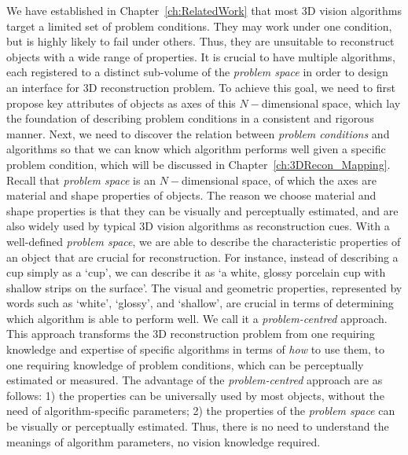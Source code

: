 We have established in Chapter~\ref{ch:RelatedWork} that most 3D vision algorithms target a limited set of problem conditions. They may work under one condition, but is highly likely to fail under others. Thus, they are unsuitable to reconstruct objects with a wide range of properties. It is crucial to have multiple algorithms, each registered to a distinct sub-volume of the \textit{problem space} in order to design an interface for 3D reconstruction problem. To achieve this goal, we need to first propose key attributes of objects as axes of this $N-$dimensional space, which lay the foundation of describing problem conditions in a consistent and rigorous manner. Next, we need to discover the relation between \textit{problem conditions} and algorithms so that we can know which algorithm performs well given a specific problem condition, which will be discussed in Chapter~\ref{ch:3DRecon_Mapping}. Recall that \textit{problem space} is an $N-$dimensional space, of which the axes are material and shape properties of objects. The reason we choose material and shape properties is that they can be visually and perceptually estimated, and are also widely used by typical 3D vision algorithms as reconstruction cues. With a well-defined \textit{problem space}, we are able to describe the characteristic properties of an object that are crucial for reconstruction. For instance, instead of describing a cup simply as a `cup', we can describe it as `a white, glossy porcelain cup with shallow strips on the surface'. The visual and geometric properties, represented by words such as `white', `glossy', and `shallow', are crucial in terms of determining which algorithm is able to perform well. We call it a \textit{problem-centred} approach. This approach transforms the 3D reconstruction problem from one requiring knowledge and expertise of specific algorithms in terms of \textit{how} to use them, to one requiring knowledge of problem conditions, which can be perceptually estimated or measured. The advantage of the \textit{problem-centred} approach are as follows: 1) the properties can be universally used by most objects, without the need of algorithm-specific parameters; 2) the properties of the \textit{problem space} can be visually or perceptually estimated. Thus, there is no need to understand the meanings of algorithm parameters, \ie no vision knowledge required.


